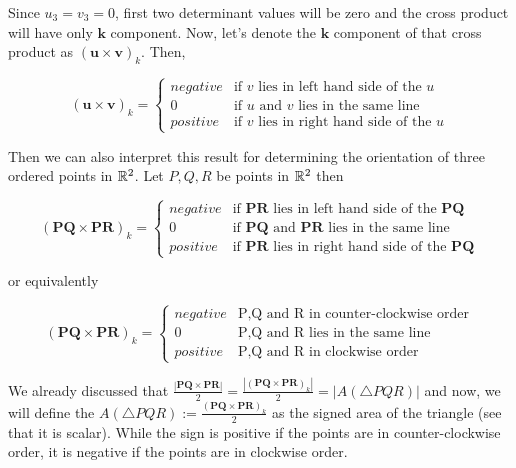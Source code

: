 \documentclass[12pt]{article}
\begin{document}
Since $u_3=v_3=0$, first two determinant values will be zero and the cross product
will have only $\pmb{k}$ component. Now, let's denote the $\pmb{k}$ component of 
that cross product as $(\pmb{u} \times \pmb{v})_k$. Then,

\[ 
(\pmb{u} \times \pmb{v})_k =   
\begin{cases} 
  negative & \text{if $v$ lies in left hand side of the $u$} \\
  0 & \text{if $u$ and $v$ lies in the same line} \\
  positive & \text{if $v$ lies in right hand side of the $u$}
\end{cases}
\]

Then we can also interpret this result for determining the orientation of three ordered
points in $\mathbb{R}^2$. Let $P,Q,R$ be points in $\mathbb{R}^2$ then

\[ 
(\pmb{PQ} \times \pmb{PR})_k =   
\begin{cases} 
  negative & \text{if $\pmb{PR}$ lies in left hand side of the $\pmb{PQ}$} \\
  0 & \text{if $\pmb{PQ}$ and $\pmb{PR}$ lies in the same line} \\
  positive & \text{if $\pmb{PR}$ lies in right hand side of the $\pmb{PQ}$}
\end{cases}
\]

or equivalently

\[ 
(\pmb{PQ} \times \pmb{PR})_k =   
\begin{cases} 
  negative & \text{P,Q and R in counter-clockwise order}\\
  0 & \text{P,Q and R lies in the same line} \\
  positive & \text{P,Q and R in clockwise order}
\end{cases}
\]

We already discussed that $\frac{|\pmb{PQ} \times \pmb{PR}|}{2} = \frac{|(\pmb{PQ} \times \pmb{PR})_k|}{2} = |A(\triangle PQR)|$ and now,
we will define the $A(\triangle PQR) := \frac{(\pmb{PQ} \times \pmb{PR})_k}{2}$ as the signed area of the triangle (see that it is scalar).
While the sign is positive if the points are in counter-clockwise order, it is negative if the points are in clockwise order.

\end{document}
